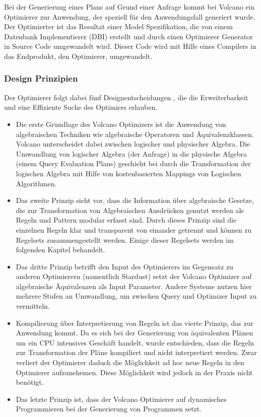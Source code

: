 Bei der Generierung eines Plans auf Grund einer Anfrage kommt bei Volcano ein Optimierer zur Anwendung, der speziell für den Anwendungsfall generiert wurde. Der Optimierter ist das Resultat einer Model Spezifikation, die von einem Datenbank Implementierer (DBI) erstellt und durch einen Optimierer Generator in Source Code umgewandelt wird. Dieser Code wird mit Hilfe eines Compilers in das Endprodukt, den Optimierer, umgewandelt.

 \subsubsection{Design Prinzipien}

Der Optimierer folgt dabei fünf Designentscheidungen \cite{graefe1993volcano}, die die Erweiterbarkeit und eine Effiziente Suche des Optimiers erlauben.

\begin{itemize}

\item Die erste Grundlage des Volcano Optimizers ist die Anwendung von algebraischen Techniken wie algebraische Operatoren und Äquivalenzklassen. Volcano unterscheidet dabei zwischen logischer und physischer Algebra. Die Umwandlung von logischer Algebra (der Anfrage) in die physische Algebra (einem Query Evaluation Plans) geschieht bei durch die Transformation der logischen Algebra mit Hilfe von kostenbasierten Mappings von Logischen Algorithmen.


\item Das zweite Prinzip sieht vor, dass die Information über algebraische Gesetze, die zur Transformation von Algebraischen Ausdrücken genutzt werden als Regeln und Pattern modular erfasst sind. Durch dieses Prinzip sind die einzelnen Regeln klar und transparent von einander getrennt und können zu Regelsets zusammengestellt werden. Einige dieser Regelsets werden im folgenden Kapitel behandelt.


\item Das dritte Prinzip betrifft den Input des Optimierers im Gegensatz zu anderen Optimierern (namentlich Stardust) setzt der Volcano Optimizer auf algebraische Äquivalenzen als Input Parameter. Andere Systeme nutzen hier mehrere Stufen an Umwandlung, um zwischen Query und Optimizer Input zu vermitteln. 

\item Kompilierung über Interpretierung von Regeln ist das vierte Prinzip, das zur Anwendung kommt. Da es sich bei der Generierung von äquivalenten Plänen um ein CPU intensives Geschäft handelt, wurde entschieden, dass die Regeln zur Transformation der Pläne kompiliert und nicht interpretiert werden. Zwar verliert der Optimierer daduch die Möglichkeit ad hoc neue Regeln in den Optimierer aufzunehemen. Diese Möglichkeit wird jedoch in der Praxis nicht benötigt.

\item Das letzte Prinzip ist, dass der Volcano Optimierer auf dynamisches Programmieren bei der Generierung von Programmen setzt. 


\end{itemize}






